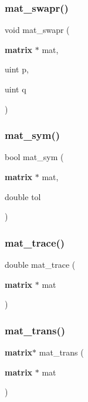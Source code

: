 \mbox{\label{mat_lib_8h_aee90e5f75a52f28010ea24611d32ba31}} 
\subsubsection{mat\+\_\+swapr()}
{\footnotesize\ttfamily void mat\+\_\+swapr (\begin{DoxyParamCaption}\item[{\textbf{ matrix} $\ast$}]{mat,  }\item[{uint}]{p,  }\item[{uint}]{q }\end{DoxyParamCaption})}

\mbox{\label{mat_lib_8h_a9eb4431829d03380de166dc90423572c}} 
\subsubsection{mat\+\_\+sym()}
{\footnotesize\ttfamily bool mat\+\_\+sym (\begin{DoxyParamCaption}\item[{\textbf{ matrix} $\ast$}]{mat,  }\item[{double}]{tol }\end{DoxyParamCaption})}

\mbox{\label{mat_lib_8h_ad20bf9a0584d4d9f13f88b471e53a523}} 
\subsubsection{mat\+\_\+trace()}
{\footnotesize\ttfamily double mat\+\_\+trace (\begin{DoxyParamCaption}\item[{\textbf{ matrix} $\ast$}]{mat }\end{DoxyParamCaption})}

\mbox{\label{mat_lib_8h_a6ea0ef2cf3ab314ff32bfdcf970deff9}} 
\subsubsection{mat\+\_\+trans()}
{\footnotesize\ttfamily \textbf{ matrix}$\ast$ mat\+\_\+trans (\begin{DoxyParamCaption}\item[{\textbf{ matrix} $\ast$}]{mat }\end{DoxyParamCaption})}

